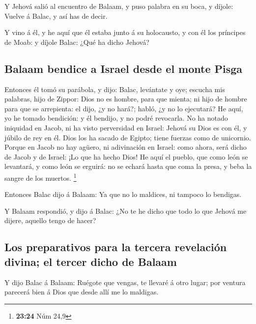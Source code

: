  Y Jehová salió al encuentro de Balaam, y puso palabra en
su boca, y díjole: Vuelve á Balac, y así has de decir.

 Y vino á él, y he aquí que él estaba junto á su
holocausto, y con él los príncipes de Moab: y díjole Balac: ¿Qué ha
dicho Jehová?

\hypertarget{balaam-bendice-a-israel-desde-el-monte-pisga}{%
\subsection{Balaam bendice a Israel desde el monte
Pisga}\label{balaam-bendice-a-israel-desde-el-monte-pisga}}

 Entonces él tomó su parábola, y dijo: Balac, levántate y
oye; escucha mis palabras, hijo de Zippor:  Dios no es
hombre, para que mienta; ni hijo de hombre para que se arrepienta: el
dijo, ¿y no hará?; habló, ¿y no lo ejecutará?  He aquí, yo
he tomado bendición: y él bendijo, y no podré revocarla. 
No ha notado iniquidad en Jacob, ni ha visto perversidad en Israel:
Jehová su Dios es con él, y júbilo de rey en él.  Dios los
ha sacado de Egipto; tiene fuerzas como de unicornio. 
Porque en Jacob no hay agüero, ni adivinación en Israel: como ahora,
será dicho de Jacob y de Israel: ¡Lo que ha hecho Dios!  He
aquí el pueblo, que como león se levantará, y como león se erguirá: no
se echará hasta que coma la presa, y beba la sangre de los muertos.
\footnote{\textbf{23:24} Núm 24,9}

 Entonces Balac dijo á Balaam: Ya que no lo maldices, ni
tampoco lo bendigas.

 Y Balaam respondió, y dijo á Balac: ¿No te he dicho que
todo lo que Jehová me dijere, aquello tengo de hacer?

\hypertarget{los-preparativos-para-la-tercera-revelaciuxf3n-divina-el-tercer-dicho-de-balaam}{%
\subsection{Los preparativos para la tercera revelación divina; el
tercer dicho de
Balaam}\label{los-preparativos-para-la-tercera-revelaciuxf3n-divina-el-tercer-dicho-de-balaam}}

 Y dijo Balac á Balaam: Ruégote que vengas, te llevaré á
otro lugar; por ventura parecerá bien á Dios que desde allí me lo
maldigas.

